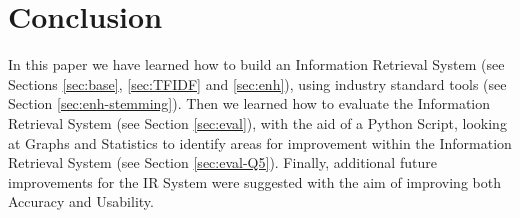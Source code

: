 \documentclass{sig-alternate}
\begin{document}
	\section{Conclusion}
	In this paper we have learned how to build an Information Retrieval System (see Sections \ref{sec:base}, \ref{sec:TFIDF} and \ref{sec:enh}), using industry standard tools (see Section \ref{sec:enh-stemming}). Then we learned how to evaluate the Information Retrieval System (see Section \ref{sec:eval}), with the aid of a Python Script, looking at Graphs and Statistics to identify areas for improvement within the Information Retrieval System (see Section \ref{sec:eval-Q5}). Finally, additional future improvements for the IR System were suggested with the aim of improving both Accuracy and Usability.


  
\end{document}
